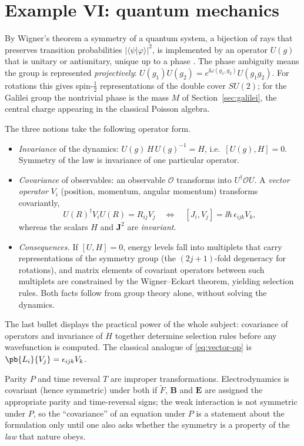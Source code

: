 \section{Example VI: quantum mechanics}
\label{sec:quantum}

By Wigner's theorem a symmetry of a quantum system, a bijection of rays that
preserves transition probabilities $|\langle\psi|\varphi\rangle|^2$, is
implemented by an operator $U(g)$ that is unitary or antiunitary, unique up to
a phase \cite{wigner}. The phase ambiguity means the group is represented
\emph{projectively}:
$U(g_1)U(g_2)=e^{\ii\omega(g_1,g_2)}U(g_1g_2)$. For rotations this gives
spin-$\tfrac12$ representations of the double cover $SU(2)$; for the
Galilei group the nontrivial phase is the mass $M$ of
Section~\ref{sec:galilei}, the central charge appearing in the classical
Poisson algebra.

The three notions take the following operator form.
\begin{itemize}[leftmargin=1.6em,itemsep=2pt]
\item \emph{Invariance} of the dynamics: $U(g)\,H\,U(g)^{-1}=H$, i.e.\
  $[U(g),H]=0$. Symmetry of the law is invariance of one particular operator.
\item \emph{Covariance} of observables: an observable $\mathcal O$
  transforms into $U^\dagger\mathcal OU$. A \emph{vector operator} $V_i$
  (position, momentum, angular momentum) transforms covariantly,
  \begin{equation}\label{eq:vector-op}
    U(R)^\dagger V_iU(R)=R_{ij}V_j\quad\Longleftrightarrow\quad
    [J_i,V_j]=\ii\hbar\,\epsilon_{ijk}V_k,
  \end{equation}
  whereas the scalars $H$ and $\bm J^2$ are \emph{invariant}.
\item \emph{Consequences.} If $[U,H]=0$, energy levels fall into multiplets
  that carry representations of the symmetry group (the $(2j{+}1)$-fold
  degeneracy for rotations), and matrix elements of covariant operators
  between such multiplets are constrained by the Wigner--Eckart theorem,
  yielding selection rules. Both facts follow from group theory alone,
  without solving the dynamics.
\end{itemize}
The last bullet displays the practical power of the whole subject:
covariance of operators and invariance of $H$ together determine selection
rules before any wavefunction is computed. The classical analogue of
\eqref{eq:vector-op} is $\pb{L_i}{V_j}=\epsilon_{ijk}V_k$.

\begin{remark}
Parity $P$ and time reversal $T$ are improper transformations. Electrodynamics
is covariant (hence symmetric) under both if $\tilde F$, ${\bm{B}}$ and ${\bm{E}}$ are
assigned the appropriate parity and time-reversal signs; the weak interaction
is not symmetric under $P$, so the ``covariance'' of an equation under $P$
is a statement about the formulation only until one also asks whether the
symmetry is a property of the \emph{law} that nature obeys.
\end{remark}

